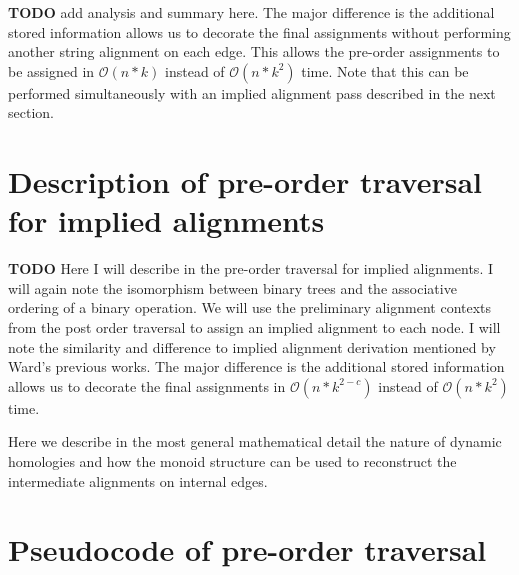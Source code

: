 \documentclass[11pt]{article}
\begin{document}
\textbf{TODO} add analysis and summary here.
The major difference is the additional stored information allows us to decorate the final assignments without performing another string alignment on each edge.
This allows the pre-order assignments to be assigned in $\mathcal{O}(n*k)$ instead of $\mathcal{O}(n*k^2)$ time.
Note that this can be performed simultaneously with an implied alignment pass described in the next section.

\section{Description of pre-order traversal for implied alignments}
\textbf{TODO}
Here I will describe in the pre-order traversal for implied alignments. I will again note the isomorphism between binary trees and the associative ordering of a binary operation. 
We will use the preliminary alignment contexts from the post order traversal to assign an implied alignment to each node. 
I will note the similarity and difference to implied alignment derivation mentioned by Ward's previous works. 
The major difference is the additional stored information allows us to decorate the final assignments in $\mathcal{O}(n*k^{2-c})$ instead of $\mathcal{O}(n*k^2)$ time.

Here we describe in the most general mathematical detail the nature of dynamic homologies and how the monoid structure can be used to reconstruct the intermediate alignments on internal edges.


\section{Pseudocode of pre-order traversal}
\end{document}

